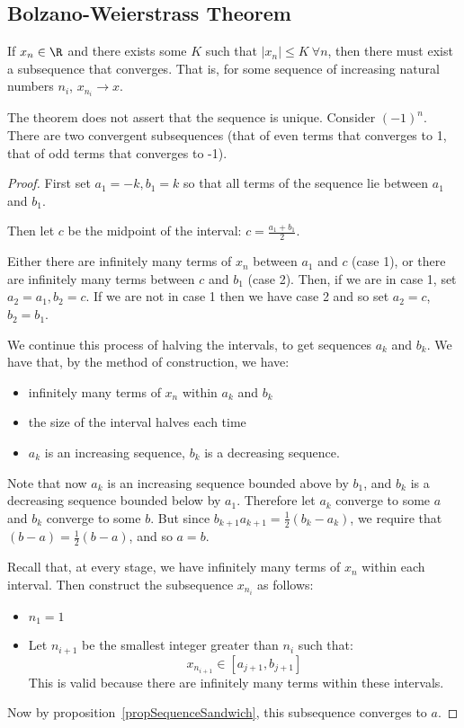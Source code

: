 \documentclass[../Main.tex]{subfiles}
\begin{document}
\subsection{Bolzano-Weierstrass Theorem}
\begin{theorem}
    If $x_n \in \R$ and there exists some $K$ such that $|x_n| \leq K~\forall n$, then there must exist a subsequence that converges. That is, for some sequence of increasing natural numbers $n_i$, $x_{n_i} \rightarrow x$.
    \label{thmBolzanoWeierstrass}
\end{theorem}
\begin{remark}
    The theorem does not assert that the sequence is unique. Consider $(-1)^n$. There are two convergent subsequences (that of even terms that converges to 1, that of odd terms that converges to -1).
\end{remark}
\begin{proof}
    First set $a_1 = -k, b_1 = k$ so that all terms of the sequence lie between $a_1$ and $b_1$.\par
    Then let $c$ be the midpoint of the interval: $c = \frac{a_1 + b_1}{2}$.\par
    Either there are infinitely many terms of $x_n$ between $a_1$ and $c$ (case 1), or there are infinitely many terms between $c$ and $b_1$ (case 2).
    Then, if we are in case 1, set $a_2 = a_1, b_2 = c$. If we are not in case 1 then we have case 2 and so set $a_2 = c$, $b_2 = b_1$.\par
    We continue this process of halving the intervals, to get sequences $a_k$ and $b_k$. We have that, by the method of construction, we have:
    \begin{itemize}
        \item infinitely many terms of $x_n$ within $a_k$ and $b_k$
        \item the size of the interval halves each time
        \item $a_k$ is an increasing sequence, $b_k$ is a decreasing sequence.
    \end{itemize}
    Note that now $a_k$ is an increasing sequence bounded above by $b_1$, and $b_k$ is a decreasing sequence bounded below by $a_1$. Therefore let $a_k$ converge to some $a$ and $b_k$ converge to some $b$. But since $b_{k+1} a_{k + 1} = \frac{1}{2}(b_k - a_k)$, we require that $(b - a) = \frac{1}{2}(b - a)$, and so $a = b$.\par
    Recall that, at every stage, we have infinitely many terms of $x_n$ within each interval. Then construct the subsequence $x_{n_i}$ as follows:
    \begin{itemize}
        \item $n_1 = 1$
        \item Let $n_{i + 1}$ be the smallest integer greater than $n_i$ such that:
            \begin{equation*}
                x_{n_{i+1}} \in [a_{j + 1}, b_{j + 1}]
            \end{equation*}
            This is valid because there are infinitely many terms within these intervals.
    \end{itemize}
    Now by proposition~\ref{propSequenceSandwich}, this subsequence converges to $a$.
\end{proof}
\end{document}
